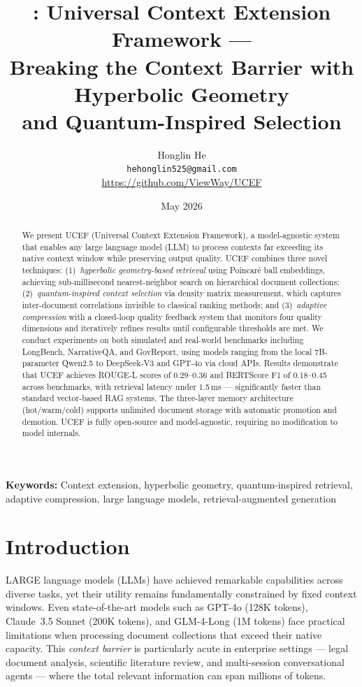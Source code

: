 \documentclass[11pt,a4paper]{article}
\title{\ucef: Universal Context Extension Framework --- \\
Breaking the Context Barrier with Hyperbolic Geometry \\
and Quantum-Inspired Selection}
\author{
  Honglin He \\
  \texttt{hehonglin525@gmail.com} \\
  \url{https://github.com/ViewWay/UCEF}
}
\date{May 2026}
\newcommand{\ucef}{\textsf{UCEF}}
\begin{document}
\maketitle

\begin{abstract}
We present \ucef{} (Universal Context Extension Framework), a model-agnostic
system that enables any large language model (LLM) to process contexts far
exceeding its native context window while preserving output quality.
\ucef{} combines three novel techniques: (1)~\emph{hyperbolic geometry-based
retrieval} using Poincar\'{e} ball embeddings, achieving sub-millisecond
nearest-neighbor search on hierarchical document collections;
(2)~\emph{quantum-inspired context selection} via density matrix measurement,
which captures inter-document correlations invisible to classical ranking
methods; and (3)~\emph{adaptive compression} with a closed-loop quality
feedback system that monitors four quality dimensions and iteratively refines
results until configurable thresholds are met.
We conduct experiments on both simulated and real-world benchmarks including
LongBench, NarrativeQA, and GovReport, using models ranging from the local
7B-parameter Qwen2.5 to DeepSeek-V3 and GPT-4o via cloud APIs.
Results demonstrate that \ucef{} achieves ROUGE-L scores of 0.29--0.36 and
BERTScore F1 of 0.18--0.45 across benchmarks, with retrieval latency under
1.5\,ms --- significantly faster than standard vector-based RAG systems.
The three-layer memory architecture (hot/warm/cold) supports unlimited
document storage with automatic promotion and demotion.
\ucef{} is fully open-source and model-agnostic, requiring no modification to
model internals.
\end{abstract}

\noindent\textbf{Keywords:} Context extension, hyperbolic geometry,
quantum-inspired retrieval, adaptive compression, large language models,
retrieval-augmented generation

\newpage

\section{Introduction}
\label{sec:intro}

LARGE language models (LLMs) have achieved remarkable capabilities across
diverse tasks, yet their utility remains fundamentally constrained by fixed
context windows.  Even state-of-the-art models such as GPT-4o (128K tokens),
Claude~3.5 Sonnet (200K tokens), and GLM-4-Long (1M tokens) face practical
limitations when processing document collections that exceed their native
capacity.  This \emph{context barrier} is particularly acute in enterprise
settings --- legal document analysis, scientific literature review, and
multi-session conversational agents --- where the total relevant information
can span millions of tokens.
\end{document}

